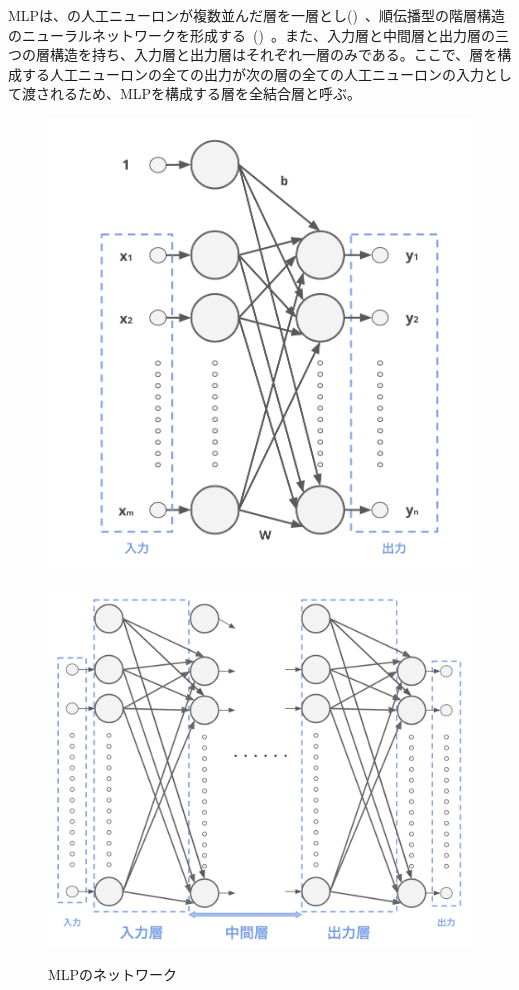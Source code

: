 MLPは、の人工ニューロンが複数並んだ層を一層とし()~、順伝播型の階層構造のニューラルネットワークを形成する~()~。また、入力層と中間層と出力層の三つの層構造を持ち、入力層と出力層はそれぞれ一層のみである。ここで、層を構成する人工ニューロンの全ての出力が次の層の全ての人工ニューロンの入力として渡されるため、MLPを構成する層を全結合層と呼ぶ。

\begin{figure}[b]
\centering
\begin{minipage}[b]{0.48\columnwidth}
\centering
\includegraphics[width=0.8\columnwidth]{figure/mlp_net0.png}
\label{fig:MLP_net0}
\end{minipage}
\begin{minipage}[b]{0.48\columnwidth}
\centering
\includegraphics[width=\columnwidth]{figure/mlp_net1.png}
\label{fig:MLP_net1}
\end{minipage}
\caption{MLPのネットワーク}
\end{figure}

